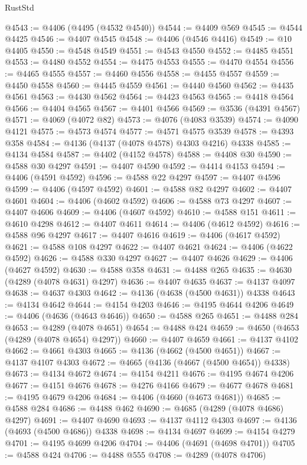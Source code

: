 \begin{lexlean}{RustStd}
\begin{coremodule}
@4543 := @4406 (@4495 (@4532 @4540))
@4544 := @4409 @569
@4545 := @4544 @4425
@4546 := @4407 @4545
@4548 := @4406 (@4546 @4416)
@4549 := @10 @4405
@4550 := @4548 @4549
@4551 := @4543 @4550
@4552 := @4485 @4551
@4553 := @4480 @4552
@4554 := @4475 @4553
@4555 := @4470 @4554
@4556 := @4465 @4555
@4557 := @4460 @4556
@4558 := @4455 @4557
@4559 := @4450 @4558
@4560 := @4445 @4559
@4561 := @4440 @4560
@4562 := @4435 @4561
@4563 := @4430 @4562
@4564 := @4423 @4563
@4565 := @4418 @4564
@4566 := @4404 @4565
@4567 := @4401 @4566
@4569 := @3536 (@4391 @4567)
@4571 := @4069 (@4072 @82)
@4573 := @4076 (@4083 @3539)
@4574 := @4090 @4121
@4575 := @4573 @4574
@4577 := @4571 @4575 @3539
@4578 := @4393 @358
@4584 := @4136 (@4137 (@4078 @4578) @4303 @4216) @4338
@4585 := @4134 @4584
@4587 := @4402 (@4152 @4578)
@4588 := @4408 @30
@4590 := @4588 @30 @4297
@4591 := @4407 @4590
@4592 := @4414 @4153
@4594 := @4406 (@4591 @4592)
@4596 := @4588 @22 @4297
@4597 := @4407 @4596
@4599 := @4406 (@4597 @4592)
@4601 := @4588 @82 @4297
@4602 := @4407 @4601
@4604 := @4406 (@4602 @4592)
@4606 := @4588 @73 @4297
@4607 := @4407 @4606
@4609 := @4406 (@4607 @4592)
@4610 := @4588 @151
@4611 := @4610 @4298
@4612 := @4407 @4611
@4614 := @4406 (@4612 @4592)
@4616 := @4588 @96 @4297
@4617 := @4407 @4616
@4619 := @4406 (@4617 @4592)
@4621 := @4588 @108 @4297
@4622 := @4407 @4621
@4624 := @4406 (@4622 @4592)
@4626 := @4588 @330 @4297
@4627 := @4407 @4626
@4629 := @4406 (@4627 @4592)
@4630 := @4588 @358
@4631 := @4488 @265
@4635 := @4630 (@4289 (@4078 @4631) @4297)
@4636 := @4407 @4635
@4637 := @4137 @4097
@4638 := @4637 @4303
@4642 := @4136 (@4638 (@4500 @4631)) @4338
@4643 := @4134 @4642
@4644 := @4154 @4203
@4646 := @4195 @4644 @4206
@4649 := @4406 (@4636 (@4643 @4646))
@4650 := @4588 @265
@4651 := @4488 @284
@4653 := @4289 (@4078 @4651)
@4654 := @4488 @424
@4659 := @4650 (@4653 (@4289 (@4078 @4654) @4297))
@4660 := @4407 @4659
@4661 := @4137 @4102
@4662 := @4661 @4303
@4665 := @4136 (@4662 (@4500 @4651))
@4667 := @4137 @4107 @4303
@4672 := @4665 (@4136 (@4667 (@4500 @4654)) @4338)
@4673 := @4134 @4672
@4674 := @4154 @4211
@4676 := @4195 @4674 @4206
@4677 := @4151 @4676
@4678 := @4276 @4166
@4679 := @4677 @4678
@4681 := @4195 @4679 @4206
@4684 := @4406 (@4660 (@4673 @4681))
@4685 := @4588 @284
@4686 := @4488 @462
@4690 := @4685 (@4289 (@4078 @4686) @4297)
@4691 := @4407 @4690
@4693 := @4137 @4112 @4303
@4697 := @4136 (@4693 (@4500 @4686)) @4338
@4698 := @4134 @4697
@4699 := @4154 @4279
@4701 := @4195 @4699 @4206
@4704 := @4406 (@4691 (@4698 @4701))
@4705 := @4588 @424
@4706 := @4488 @555
@4708 := @4289 (@4078 @4706)

\end{coremodule}
\end{lexlean}
